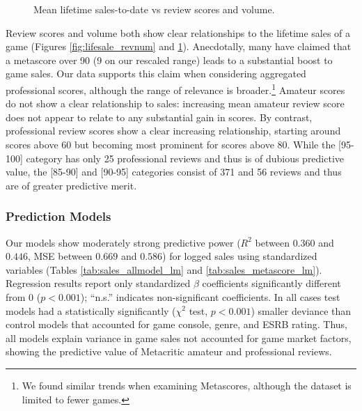 \documentclass[letterpaper]{article}
\begin{document}
\begin{figure}[tb]
\begin{subfigure}[b]{\linewidth}
\label{fig:lifesale_revscore}
\end{subfigure}

\caption{Mean lifetime sales-to-date vs review scores and volume.}
\label{fig:lifesale_plots}
\end{figure}


Review scores and volume both show clear relationships to the lifetime sales of a game (Figures \ref{fig:lifesale_revnum} and \ref{fig:lifesale_revscore}). Anecdotally, many have claimed that a metascore over 90 (9 on our rescaled range) leads to a substantial boost to game sales. Our data supports this claim when considering aggregated professional scores, although the range of relevance is broader.\footnote{We found similar trends when examining Metascores, although the dataset is limited to fewer games.} Amateur scores do not show a clear relationship to sales: increasing mean amateur review score does not appear to relate to any substantial gain in scores. By contrast, professional review scores show a clear increasing relationship, starting around scores above 60 but becoming most prominent for scores above 80. While the [95-100] category has only 25 professional reviews and thus is of dubious predictive value, the [85-90] and [90-95] categories consist of 371 and 56 reviews and thus are of greater predictive merit.

\subsubsection{Prediction Models}
Our models show moderately strong predictive power ($R^2$ between $0.360$ and $0.446$, MSE between $0.669$ and $0.586$) for logged sales using standardized variables (Tables \ref{tab:sales_allmodel_lm} and \ref{tab:sales_metascore_lm}). Regression results report only standardized $\beta$ coefficients significantly different from 0 ($p < 0.001$); ``n.s.'' indicates non-significant coefficients. In all cases test models had a statistically significantly ($\chi^2$ test, $p < 0.001$) smaller deviance than control models that accounted for game console, genre, and ESRB rating. Thus, all models explain variance in game sales not accounted for game market factors, showing the predictive value of Metacritic amateur and professional reviews.
\end{document}
